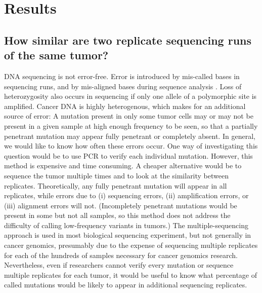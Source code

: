 \documentclass[11pt]{article} %
\begin{document}
\section*{Results}

\subsection*{How similar are two replicate sequencing runs of the same tumor?}


DNA sequencing is not error-free. Error is introduced by mis-called bases in sequencing runs, and by mis-aligned bases during sequence analysis \citep{seqerror}. Loss of heterozygosity also occurs in sequencing if only one allele of a polymorphic site is amplified. Cancer DNA is highly heterogenous, which makes for an additional source of error: A mutation present in only some tumor cells may or may not be present in a given sample at high enough frequency to be seen, so that a partially penetrant mutation may appear fully penetrant or completely absent. In general, we would like to know how often these errors occur. One way of investigating this question would be to use PCR to verify each individual mutation. However, this method is expensive and time consuming. A cheaper alternative would be to sequence the tumor multiple times and to look at the similarity between replicates. Theoretically, any fully penetrant mutation will appear in all replicates, while errors due to (i) sequencing errors, (ii) amplification errors, or (iii) alignment errors will not. (Incompletely penetrant mutations would be present in some but not all samples, so this method does not address the difficulty of calling low-frequency variants in tumors.) The multiple-sequencing approach is used in most biological sequencing experiment, but not generally in cancer genomics, presumably due to the expense of sequencing multiple replicates for each of the hundreds of samples necessary for cancer genomics research. Nevertheless, even if researchers cannot verify every mutation or sequence multiple replicates for each tumor, it would be useful to know what percentage of called mutations would be likely to appear in additional sequencing replicates.
\end{document}
